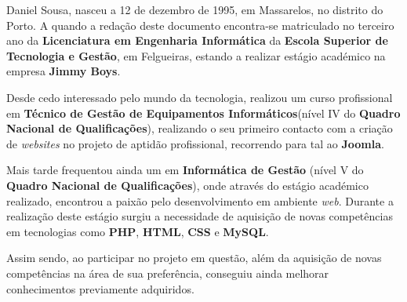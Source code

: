 
Daniel Sousa, nasceu a 12 de dezembro de 1995, em Massarelos, no distrito do Porto. A quando a redação deste documento encontra-se matriculado no terceiro ano da \textbf{Licenciatura em Engenharia Informática} da \textbf{Escola Superior de Tecnologia e Gestão}, em Felgueiras, estando a realizar estágio académico na empresa \textbf{Jimmy Boys}.

Desde cedo interessado pelo mundo da tecnologia, realizou um curso profissional em \textbf{Técnico de Gestão de Equipamentos Informáticos}(nível IV do \textbf{Quadro Nacional de Qualificações}), realizando o seu primeiro contacto com a criação de \textit{websites} no projeto de aptidão profissional, recorrendo para tal ao  \textbf{Joomla}.

Mais tarde frequentou ainda um \textbf{} em \textbf{Informática de Gestão} (nível V do \textbf{Quadro Nacional de Qualificações}), onde através do estágio académico realizado, encontrou a paixão pelo desenvolvimento em ambiente \textit{web}. Durante a realização deste estágio surgiu a necessidade de aquisição de novas competências em tecnologias como \textbf{PHP}, \textbf{HTML}, \textbf{CSS} e \textbf{MySQL}.

Assim sendo, ao participar no projeto em questão, além da aquisição de novas competências na área de sua preferência, conseguiu ainda melhorar conhecimentos previamente adquiridos.

\newpage